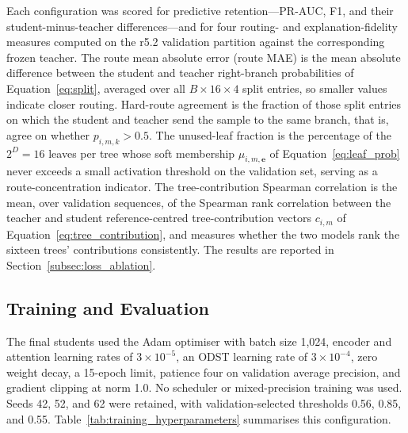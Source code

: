 \smallskip
Each configuration was scored for predictive retention---PR-AUC, F1, and
their student-minus-teacher differences---and for four routing- and
explanation-fidelity measures computed on the r5.2 validation partition
against the corresponding frozen teacher. The route mean absolute error
(route MAE) is the mean absolute difference between the student and teacher
right-branch probabilities of Equation~\eqref{eq:split}, averaged over all
\(B\times16\times4\) split entries, so smaller values indicate closer
routing. Hard-route agreement is the fraction of those split entries on which
the student and teacher send the sample to the same branch, that is, agree on
whether \(p_{i,m,k}>0.5\). The unused-leaf fraction is the percentage of the
\(2^{D}=16\) leaves per tree whose soft membership
\(\mu_{i,m,\mathbf e}\) of Equation~\eqref{eq:leaf_prob} never exceeds a small
activation threshold on the validation set, serving as a route-concentration
indicator. The tree-contribution Spearman correlation is the mean, over
validation sequences, of the Spearman rank correlation between the teacher and
student reference-centred tree-contribution vectors \(c_{i,m}\) of
Equation~\eqref{eq:tree_contribution}, and measures whether the two models
rank the sixteen trees' contributions consistently. The results are reported
in Section~\ref{subsec:loss_ablation}.

\subsection{Training and Evaluation}
\label{subsec:training}
The final students used the Adam optimiser with batch size 1,024, encoder and attention
learning rates of \(3\times10^{-5}\), an ODST learning rate of
\(3\times10^{-4}\), zero weight decay, a 15-epoch limit, patience four on
validation average precision, and gradient clipping at norm 1.0. No
scheduler or mixed-precision training was used. Seeds 42, 52, and 62 were
retained, with validation-selected thresholds 0.56, 0.85, and 0.55.
Table~\ref{tab:training_hyperparameters} summarises this configuration.

